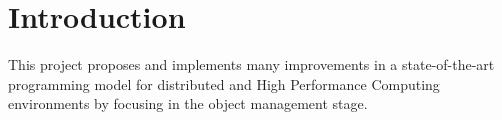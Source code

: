 \section{Introduction}
\label{sec:introduction}
This project proposes and implements many improvements in a state-of-the-art programming model for distributed and High Performance Computing environments by focusing in the object management stage.\\
\\
